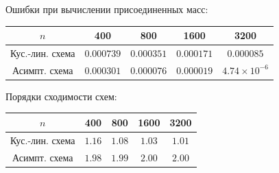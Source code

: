 \documentclass[ignoreonframetext,unicode]{beamer}
\begin{document}


\begin{frame}
	Ошибки при вычислении присоединенных масс:
	\begin{table}[!h]
\centering			
		\begin{tabular}{|c|c|c|c|c|}
			\hline
			$n$ & 400 & 800 & 1600 & 3200 \\\hline
			Кус.-лин. схема & $0.000739$ & $0.000351$ & $0.000171$ & $0.000085$\\
			\hline
			Асимпт. схема &  $0.000301$ & $0.000076$ & $0.000019$ & $4.74\times10^{-6}$ \\
			\hline
		\end{tabular}
	\end{table}	
	Порядки сходимости схем:
	\begin{table}[!h]
\centering						
		\begin{tabular}{|c|c|c|c|c|}
			\hline
			$n$ & 400 & 800 & 1600 & 3200 \\ \hline
			Кус.-лин. схема &  $1.16$ & $1.08$ & $1.03$ & $1.01$\\
			\hline
			Асимпт. схема & $1.98$ & $1.99$ & $2.00$ & $2.00$ \\
			\hline
		\end{tabular}
	\end{table}
\end{frame}
\end{document}

